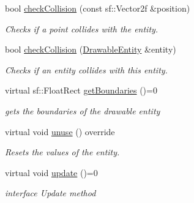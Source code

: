 \begin{DoxyCompactItemize}
bool \hyperlink{class_drawable_entity_a4488d49a6e020b228aae6887ca6b644e}{check\+Collision} (const sf\+::\+Vector2f \&position)
\begin{DoxyCompactList}\small\item\em Checks if a point collides with the entity. \end{DoxyCompactList}\item 
bool \hyperlink{class_drawable_entity_a565c4767989b6390b06b52137b249ce5}{check\+Collision} (\hyperlink{class_drawable_entity}{Drawable\+Entity} \&entity)
\begin{DoxyCompactList}\small\item\em Checks if an entity collides with this entity. \end{DoxyCompactList}\item 
virtual sf\+::\+Float\+Rect \hyperlink{class_drawable_entity_a352a101e3be05d25e1a10e5f72ccb9e3}{get\+Boundaries} ()=0
\begin{DoxyCompactList}\small\item\em gets the boundaries of the drawable entity \end{DoxyCompactList}\item 
virtual void \hyperlink{class_drawable_entity_aabea8715834f6cee7fd36b038d1a4843}{unuse} () override
\begin{DoxyCompactList}\small\item\em Resets the values of the entity. \end{DoxyCompactList}\item 
virtual void \hyperlink{class_drawable_entity_acbf8317de062a2e0e79f646dbe75249c}{update} ()=0
\begin{DoxyCompactList}\small\item\em interface Update method \end{DoxyCompactList}\end{DoxyCompactItemize}

